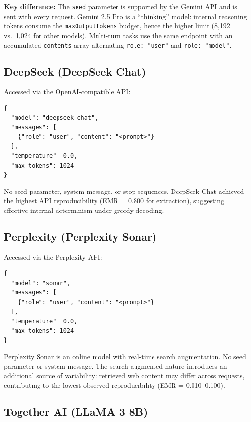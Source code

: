 \documentclass[11pt]{article}
\begin{document}
\noindent \textbf{Key difference:} The \texttt{seed} parameter is supported by the Gemini API and is sent with every request. Gemini 2.5 Pro is a ``thinking'' model: internal reasoning tokens consume the \texttt{maxOutputTokens} budget, hence the higher limit (8,192 vs.\ 1,024 for other models). Multi-turn tasks use the same endpoint with an accumulated \texttt{contents} array alternating \texttt{role: "user"} and \texttt{role: "model"}.

\subsection{DeepSeek (DeepSeek Chat)}

Accessed via the OpenAI-compatible API:

\begin{lstlisting}[caption={DeepSeek Chat API payload.}]
{
  "model": "deepseek-chat",
  "messages": [
    {"role": "user", "content": "<prompt>"}
  ],
  "temperature": 0.0,
  "max_tokens": 1024
}
\end{lstlisting}

\noindent No seed parameter, system message, or stop sequences. DeepSeek Chat achieved the highest API reproducibility (EMR = 0.800 for extraction), suggesting effective internal determinism under greedy decoding.

\subsection{Perplexity (Perplexity Sonar)}

Accessed via the Perplexity API:

\begin{lstlisting}[caption={Perplexity Sonar API payload.}]
{
  "model": "sonar",
  "messages": [
    {"role": "user", "content": "<prompt>"}
  ],
  "temperature": 0.0,
  "max_tokens": 1024
}
\end{lstlisting}

\noindent Perplexity Sonar is an online model with real-time search augmentation. No seed parameter or system message. The search-augmented nature introduces an additional source of variability: retrieved web content may differ across requests, contributing to the lowest observed reproducibility (EMR = 0.010--0.100).

\subsection{Together AI (LLaMA 3 8B)}
\end{document}
